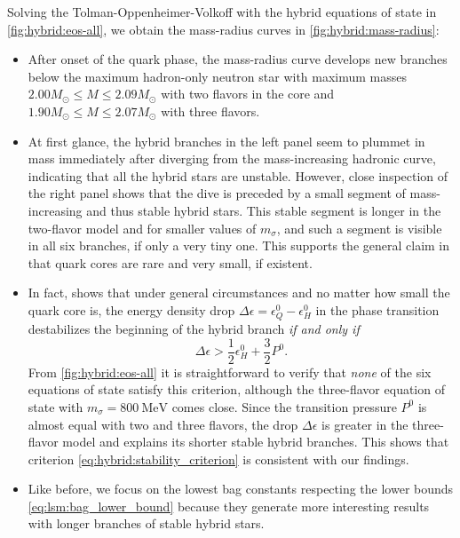 Solving the Tolman-Oppenheimer-Volkoff with the hybrid equations of state in \cref{fig:hybrid:eos-all},
we obtain the mass-radius curves in \cref{fig:hybrid:mass-radius}:
\begin{itemize}
\item After onset of the quark phase, the mass-radius curve develops new branches below the maximum hadron-only neutron star
      with maximum masses $2.00 M_\odot \leq M \leq 2.09 M_\odot$ with two flavors in the core
      and $1.90 M_\odot \leq M \leq 2.07 M_\odot$ with three flavors.
\item At first glance, the hybrid branches in the left panel seem to plummet in mass immediately after diverging from the mass-increasing hadronic curve,
      indicating that all the hybrid stars are unstable.
      However, close inspection of the right panel shows that the dive is preceded by a small segment of mass-increasing and thus stable hybrid stars.
      This stable segment is longer in the two-flavor model and for smaller values of $m_\sigma$,
      and such a segment is visible in all six branches, if only a very tiny one.
      This supports the general claim in \cite{ref:quark_star_review} that quark cores are rare and very small, if existent.
\item In fact, \cite[equation 15]{ref:hybrid_star_stability_criterion} shows that under general circumstances and no matter how small the quark core is,
      the energy density drop $\Delta \epsilon = \epsilon_Q^0 - \epsilon_H^0$ in the phase transition
      destabilizes the beginning of the hybrid branch \emph{if and only if}
      \begin{equation}
          \Delta \epsilon > \frac12 \epsilon_H^0 + \frac32 P^0.
      \label{eq:hybrid:stability_criterion}
      \end{equation}
      From \cref{fig:hybrid:eos-all} it is straightforward to verify that \emph{none} of the six equations of state satisfy this criterion,
      although the three-flavor equation of state with $m_\sigma=\SI{800}{\mega\electronvolt}$ comes close.
      Since the transition pressure $P^0$
      is almost equal with two and three flavors,
      the drop $\Delta \epsilon$ is greater in the three-flavor model and explains its shorter stable hybrid branches.
      This shows that criterion \eqref{eq:hybrid:stability_criterion} is consistent with our findings. 
\item Like before, we focus on the lowest bag constants respecting the lower bounds \eqref{eq:lsm:bag_lower_bound}
      because they generate more interesting results with longer branches of stable hybrid stars.

\end{itemize}
